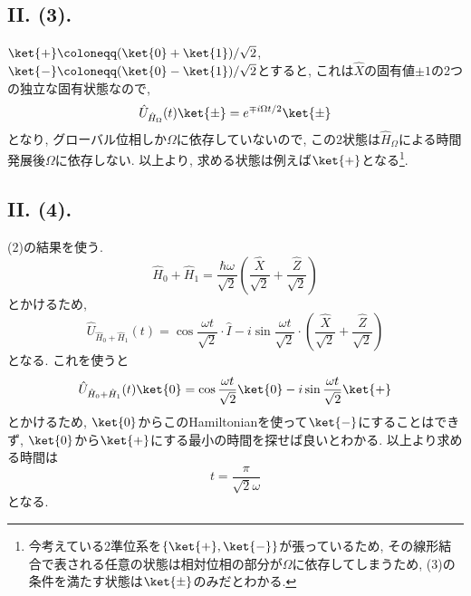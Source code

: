 \subsection*{II. (3). }
$\ket{+}\coloneqq (\ket{0}+\ket{1})/\sqrt{2}$, $\ket{-}\coloneqq (\ket{0}-\ket{1})/\sqrt{2}$とすると, これは$\hat{X}$の固有値$\pm 1$の2つの独立な固有状態なので, 
\begin{equation}
  \hat{U}_{\hat{H}_\Omega}(t)\ket{\pm}=e^{\mp i\Omega t/2}\ket{\pm}
\end{equation}
となり, グローバル位相しか$\Omega$に依存していないので, この2状態は$\hat{H}_\Omega$による時間発展後$\Omega$に依存しない. 
以上より, 求める状態は例えば$\ket{+}$となる\footnote{今考えている2準位系を$\{\ket{+}, \ket{-}\}$が張っているため, その線形結合で表される任意の状態は相対位相の部分が$\Omega$に依存してしまうため, (3)の条件を満たす状態は$\ket{\pm}$のみだとわかる. }. 



\subsection*{II. (4). }
(2)の結果を使う. 
\begin{equation}
  \hat{H}_0+\hat{H}_1=\frac{\hbar \omega}{\sqrt{2}}\left( \frac{\hat{X}}{\sqrt{2}}+\frac{\hat{Z}}{\sqrt{2}} \right)
\end{equation}
とかけるため, 
\begin{equation}
  \hat{U}_{\hat{H}_0+\hat{H}_1}(t)=\cos\frac{\omega t}{\sqrt{2}}\cdot\hat{I}-i\sin\frac{\omega t}{\sqrt{2}}\cdot \left(\frac{\hat{X}}{\sqrt{2}}+\frac{\hat{Z}}{\sqrt{2}}\right)
\end{equation}
となる. 
これを使うと
\begin{equation}
  \hat{U}_{\hat{H}_0+\hat{H}_1}(t)\ket{0}=\cos\frac{\omega t}{\sqrt{2}}\ket{0}-i\sin\frac{\omega t}{\sqrt{2}}\ket{+}
\end{equation}
とかけるため, $\ket{0}$からこのHamiltonianを使って$\ket{-}$にすることはできず, $\ket{0}$から$\ket{+}$にする最小の時間を探せば良いとわかる. 
以上より求める時間は
\begin{equation}
  t=\frac{\pi}{\sqrt{2}\omega}
\end{equation}
となる. 


